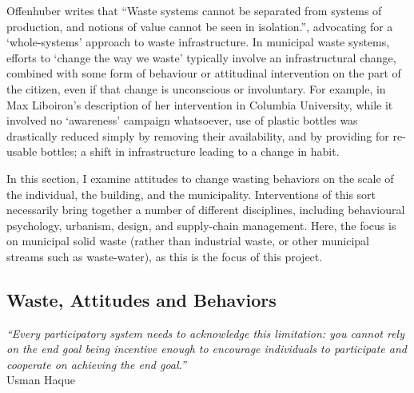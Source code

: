 \documentclass[nofonts,nols,justified,nobib]{tufte-book}
\begin{document}
Offenhuber writes that ``Waste systems cannot be separated from systems of production, and notions of value cannot be seen in isolation.'', advocating for a `whole-systems' approach to waste infrastructure. In municipal waste systems, efforts to `change the way we waste' typically involve an infrastructural change, combined with some form of behaviour or attitudinal intervention on the part of the citizen, even if that change is unconscious or involuntary. For example, in Max Liboiron's description of her intervention in Columbia University, while it involved no `awareness' campaign whatsoever, use of plastic bottles was drastically reduced simply by removing their availability, and by providing for re-usable bottles; a shift in infrastructure leading to a change in habit. \cite{liboiron_against_2014}

In this section, I examine attitudes to change wasting behaviors on the scale of the individual, the building, and the municipality. Interventions of this sort necessarily bring together a number of different disciplines, including behavioural psychology, urbanism, design, and supply-chain management. Here, the focus is on municipal solid waste (rather than industrial waste, or other municipal streams such as waste-water), as this is the focus of this project.

\subsection*{Waste, Attitudes and Behaviors}

\begin{flushright}
\emph{``Every participatory system needs to acknowledge this limitation: you cannot
 rely on the end goal being incentive enough to encourage individuals to 
participate and cooperate on achieving the end goal.''} \cite{haque_notes_2008}\\
Usman Haque
\end{flushright}
\end{document}
